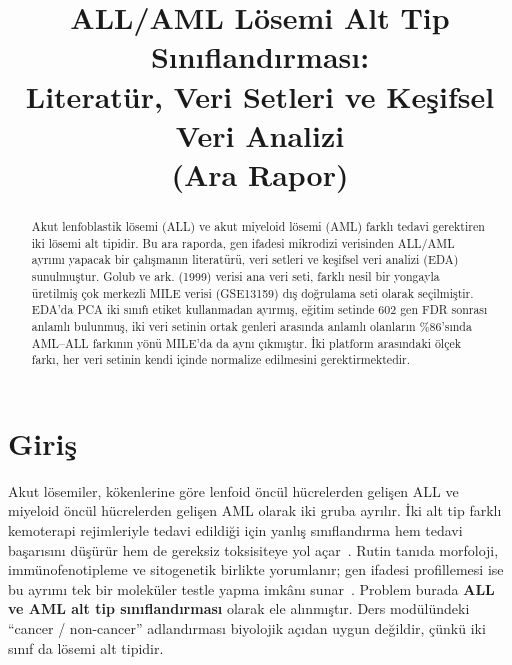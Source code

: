 \documentclass[conference]{IEEEtran}
\begin{document}
\title{ALL/AML Lösemi Alt Tip Sınıflandırması:\\ Literatür, Veri Setleri ve Keşifsel Veri Analizi\\ (Ara Rapor)}

\author{
}

\maketitle

\begin{abstract}
Akut lenfoblastik lösemi (ALL) ve akut miyeloid lösemi (AML) farklı tedavi gerektiren iki lösemi alt tipidir. Bu ara raporda, gen ifadesi mikrodizi verisinden ALL/AML ayrımı yapacak bir çalışmanın literatürü, veri setleri ve keşifsel veri analizi (EDA) sunulmuştur. Golub ve ark. (1999) verisi ana veri seti, farklı nesil bir yongayla üretilmiş çok merkezli MILE verisi (GSE13159) dış doğrulama seti olarak seçilmiştir. EDA'da PCA iki sınıfı etiket kullanmadan ayırmış, eğitim setinde 602 gen FDR sonrası anlamlı bulunmuş, iki veri setinin ortak genleri arasında anlamlı olanların \%86'sında AML--ALL farkının yönü MILE'da da aynı çıkmıştır. İki platform arasındaki ölçek farkı, her veri setinin kendi içinde normalize edilmesini gerektirmektedir.
\end{abstract}


\section{Giriş}
Akut lösemiler, kökenlerine göre lenfoid öncül hücrelerden gelişen ALL ve miyeloid öncül hücrelerden gelişen AML olarak iki gruba ayrılır. İki alt tip farklı kemoterapi rejimleriyle tedavi edildiği için yanlış sınıflandırma hem tedavi başarısını düşürür hem de gereksiz toksisiteye yol açar~\cite{golub1999}. Rutin tanıda morfoloji, immünofenotipleme ve sitogenetik birlikte yorumlanır; gen ifadesi profillemesi ise bu ayrımı tek bir moleküler testle yapma imkânı sunar~\cite{golub1999,haferlach2010}. Problem burada \textbf{ALL ve AML alt tip sınıflandırması} olarak ele alınmıştır. Ders modülündeki ``cancer / non-cancer'' adlandırması biyolojik açıdan uygun değildir, çünkü iki sınıf da lösemi alt tipidir.
\end{document}
